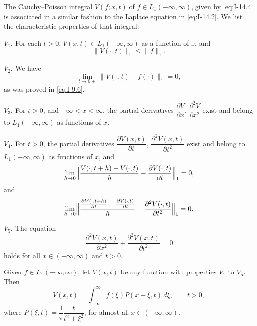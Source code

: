 The Cauchy--Poisson integral $V(f;x,t)$ of $f\in L_1(-\infty,\infty)$, given by \eqref{eq:I-14.4} is associated in a similar fashion to the Laplace equation in \eqref{eq:I-14.2}. We list the characteristic properties of that integral:

\noindent\textbf{$V_1$.} For each $t>0$, $V(x,t)\in L_1(-\infty,\infty)$ as a function of $x$, and
\begin{equation*}
\|V(\cdot,t)\|_1\le\|f\|_1.
\end{equation*}

\noindent\textbf{$V_2$.} We have
\begin{equation*}
\lim_{t\to 0+}\|V(\cdot,t)-f(\cdot)\|_1=0,
\end{equation*}
as was proved in \eqref{eq:I-9.6}.

\noindent\textbf{$V_3$.} For $t>0$, and $-\infty<x<\infty$, the partial derivatives $\dfrac{\partial V}{\partial x}$, $\dfrac{\partial^{2}V}{\partial x^{2}}$ exist and belong to $L_1(-\infty,\infty)$ as functions of $x$.

\noindent\textbf{$V_4$.} For $t>0$, the partial derivatives $\dfrac{\partial V(x,t)}{\partial t}$, $\dfrac{\partial^{2}V(x,t)}{\partial t^{2}}$ exist and belong to $L_1(-\infty,\infty)$ as functions of $x$, and
\begin{equation*}
\lim_{h\to 0}\Bigl\|\frac{V(\cdot,t+h)-V(\cdot,t)}{h}-\frac{\partial V(\cdot,t)}{\partial t}\Bigr\|_1=0,
\end{equation*}
and
\begin{equation*}
\lim_{h\to 0}\Bigl\|\frac{\frac{\partial V(\cdot,t+h)}{\partial t}-\frac{\partial V(\cdot,t)}{\partial t}}{h}-\frac{\partial^{2}V(\cdot,t)}{\partial t^{2}}\Bigr\|_1=0.
\end{equation*}

\noindent\textbf{$V_5$.} The equation
\begin{equation*}
\frac{\partial^{2}V(x,t)}{\partial x^{2}}+\frac{\partial^{2}V(x,t)}{\partial t^{2}}=0
\end{equation*}
holds for all $x\in(-\infty,\infty)$ and $t>0$.

\begin{theorem}\label{thm:I-28}
Given $f\in L_1(-\infty,\infty)$, let $V(x,t)$ be any function with properties $V_1$ to $V_5$. Then
\begin{equation*}
V(x,t)=\int_{-\infty}^{\infty}f(\xi)P(x-\xi,t)\,d\xi,\qquad t>0,
\end{equation*}
where $P(\xi,t)=\dfrac{1}{\pi}\dfrac{t}{t^{2}+\xi^{2}}$, for almost all $x\in(-\infty,\infty)$.
\end{theorem}

